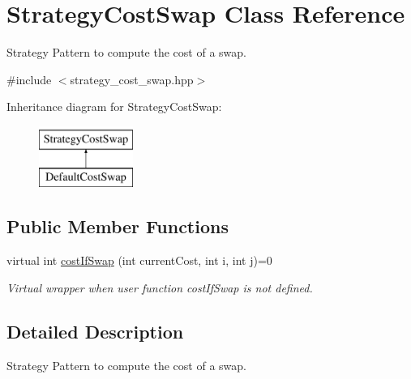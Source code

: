 \hypertarget{classStrategyCostSwap}{\section{\-Strategy\-Cost\-Swap \-Class \-Reference}
\label{classStrategyCostSwap}
}


\-Strategy \-Pattern to compute the cost of a swap.  




{\ttfamily \#include $<$strategy\-\_\-cost\-\_\-swap.\-hpp$>$}

\-Inheritance diagram for \-Strategy\-Cost\-Swap\-:\begin{figure}[H]
\begin{center}
\leavevmode
\includegraphics[height=2.000000cm]{classStrategyCostSwap}
\end{center}
\end{figure}
\subsection*{\-Public \-Member \-Functions}
\begin{DoxyCompactItemize}
\item 
virtual int \hyperlink{classStrategyCostSwap_a154e8db5c0e7cc22bd33942bbe4b8618}{cost\-If\-Swap} (int current\-Cost, int i, int j)=0
\begin{DoxyCompactList}\small\item\em \-Virtual wrapper when user function cost\-If\-Swap is not defined. \end{DoxyCompactList}\end{DoxyCompactItemize}


\subsection{\-Detailed \-Description}
\-Strategy \-Pattern to compute the cost of a swap. 

